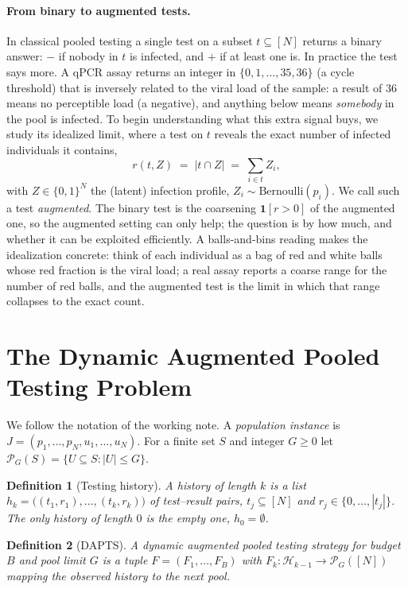 \documentclass[11pt]{article}
\newtheorem{definition}{Definition}
\begin{document}
\paragraph{From binary to augmented tests.}
In classical pooled testing a single test on a subset $t \subseteq [N]$ returns a
binary answer: $-$ if nobody in $t$ is infected, and $+$ if at least one is. In
practice the test says more. A qPCR assay returns an integer in
$\{0,1,\dots,35,36\}$ (a cycle threshold) that is inversely related to the viral
load of the sample: a result of $36$ means no perceptible load (a negative), and
anything below means \emph{somebody} in the pool is infected. To begin
understanding what this extra signal buys, we study its idealized limit, where a
test on $t$ reveals the exact number of infected individuals it contains,
\[
  r(t,Z) \;=\; |t \cap Z| \;=\; \textstyle\sum_{i \in t} Z_i,
\]
with $Z \in \{0,1\}^N$ the (latent) infection profile, $Z_i \sim
\mathrm{Bernoulli}(p_i)$. We call such a test \emph{augmented}. The binary test is
the coarsening $\mathbf{1}[r > 0]$ of the augmented one, so the augmented setting
can only help; the question is by how much, and whether it can be exploited
efficiently. A balls-and-bins reading makes the idealization concrete: think of
each individual as a bag of red and white balls whose red fraction is the viral
load; a real assay reports a coarse range for the number of red balls, and the
augmented test is the limit in which that range collapses to the exact count.

\section{The Dynamic Augmented Pooled Testing Problem}
We follow the notation of the working note. A \emph{population instance} is
$J=(p_1,\dots,p_N,u_1,\dots,u_N)$. For a finite set $S$ and integer $G\ge 0$ let
$\mathcal{P}_G(S)=\{U\subseteq S : |U|\le G\}$.

\begin{definition}[Testing history]
A history of length $k$ is a list $h_k=\big((t_1,r_1),\dots,(t_k,r_k)\big)$ of
test--result pairs, $t_j\subseteq[N]$ and $r_j\in\{0,\dots,|t_j|\}$. The only
history of length $0$ is the empty one, $h_0=\emptyset$.
\end{definition}

\begin{definition}[DAPTS]
A \emph{dynamic augmented pooled testing strategy} for budget $B$ and pool limit
$G$ is a tuple $F=(F_1,\dots,F_B)$ with $F_k:\mathcal{H}_{k-1}\to
\mathcal{P}_G([N])$ mapping the observed history to the next pool.
\end{definition}
\end{document}
